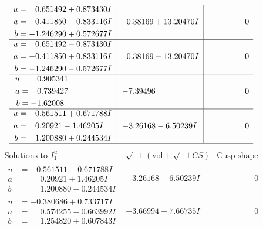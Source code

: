 \documentclass[1p]{elsarticle_modified}
\theoremstyle{definition}
\newcommand{\I}{\sqrt{-1}}
\begin{document}
$$\begin{array}{c|c|c}
\begin{aligned}
u &= \phantom{-}0.651492 + 0.873430 I \\
a &= -0.411850 - 0.833116 I \\
b &= -1.246290 + 0.572677 I\end{aligned}
 & \phantom{-}0.38169 + 13.20470 I & \phantom{-0.000000 } 0 \\ \hline\begin{aligned}
u &= \phantom{-}0.651492 - 0.873430 I \\
a &= -0.411850 + 0.833116 I \\
b &= -1.246290 - 0.572677 I\end{aligned}
 & \phantom{-}0.38169 - 13.20470 I & \phantom{-0.000000 } 0 \\ \hline\begin{aligned}
u &= \phantom{-}0.905341\phantom{ +0.000000I} \\
a &= \phantom{-}0.739427\phantom{ +0.000000I} \\
b &= -1.62008\phantom{ +0.000000I}\end{aligned}
 & -7.39496\phantom{ +0.000000I} & \phantom{-0.000000 } 0 \\ \hline\begin{aligned}
u &= -0.561511 + 0.671788 I \\
a &= \phantom{-}0.20921 - 1.46205 I \\
b &= \phantom{-}1.200880 + 0.244534 I\end{aligned}
 & -3.26168 - 6.50239 I & \phantom{-0.000000 } 0\\
 \hline 
 \end{array}$$\newpage$$\begin{array}{c|c|c}  
\text{Solutions to }I^u_{1}& \I (\text{vol} + \sqrt{-1}CS) & \text{Cusp shape}\\
 \hline 
\begin{aligned}
u &= -0.561511 - 0.671788 I \\
a &= \phantom{-}0.20921 + 1.46205 I \\
b &= \phantom{-}1.200880 - 0.244534 I\end{aligned}
 & -3.26168 + 6.50239 I & \phantom{-0.000000 } 0 \\ \hline\begin{aligned}
u &= -0.380686 + 0.733717 I \\
a &= \phantom{-}0.574255 - 0.663992 I \\
b &= \phantom{-}1.254820 + 0.607843 I\end{aligned}
 & -3.66994 - 7.66735 I & \phantom{-0.000000 } 0 \\ \hline\begin{aligned}

\end{aligned}
\end{array}$$
\end{document}
